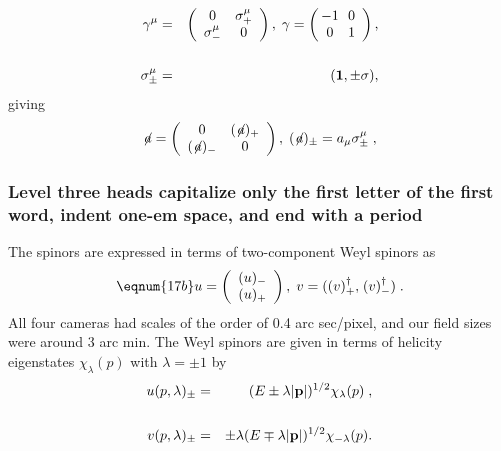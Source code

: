 \begin{article}
\begin{mathletters}
   \begin{eqnarray}
      \gamma^\mu & = & \left(\begin{array}{cc} 0 & 
      \sigma^\mu_+ \\ 
      \sigma^\mu_- & 0 \end{array} \right), 
      \;\gamma = \left( \begin{array}{cc} 
      \! \! -1 & \! \! 0 \\ \! \! 0 & \! \! 1  
      \end{array} \right), \\ & & \nonumber \\
      \sigma^\mu_{\pm} & = & ({\bf 1} ,\pm \sigma),
   \end{eqnarray}
giving 
   \begin{eqnarray}
      \not\!a= \left(\begin{array}{cc}0 & 
      (\not\!a)_+\\(\not\!a)_- & 
      0\end{array}\right), 
      \;(\not\!a)_\pm=a_\mu\sigma^\mu_\pm\;,
   \end{eqnarray}
\end{mathletters}

\subsubsection{Level three heads capitalize only 
the first letter of the first word, indent one-em 
space, and end with a period}
The spinors are expressed in terms 
of two-component Weyl spinors as
\begin{equation}
\eqnum{17b}      %
   u=\left(\begin{array}{c}(u)_-\\(u)
   _+\end{array}\right),\;v={\bf 
   (}(v)^\dagger_+{\bf ,} \; (v)^\dagger_-{\bf )}\;.
\end{equation}
All four cameras had scales of the order of 0.4 arc 
sec/pixel, and our field sizes were around 3 arc min.  
The Weyl spinors are given in terms of helicity 
eigen\-states $\chi_\lambda(p)$ with $\lambda=\pm1$ by
\begin{eqnarray}
   u(p, \lambda)_\pm & = & 
   (E\pm\lambda|{\bf p}|)^{1/2}\chi_\lambda(p)\;, 
   \nonumber \\ & & \\v(p,\lambda)_\pm & = & 
   \pm\lambda(E\mp\lambda|
   {\bf p}|)^{1/2}\chi_{-\lambda}(p). \nonumber
\end{eqnarray}


\end{article}
